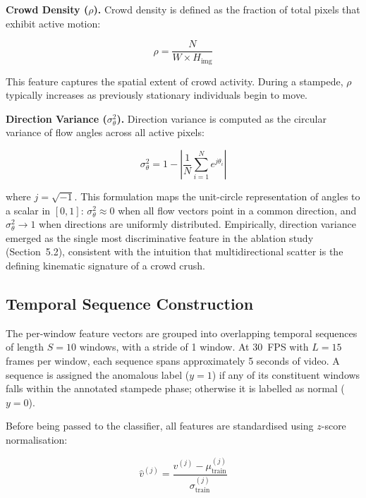 \textbf{Crowd Density ($\rho$).} Crowd density is defined as the fraction of total pixels that exhibit active motion:

\begin{equation}
  \rho = \frac{N}{W \times H_{\text{img}}}
  \label{eq:density}
\end{equation}

This feature captures the spatial extent of crowd activity. During a stampede, $\rho$ typically increases as previously stationary individuals begin to move.

\textbf{Direction Variance ($\sigma^2_\theta$).} Direction variance is computed as the circular variance of flow angles across all active pixels:

\begin{equation}
  \sigma^2_\theta = 1 - \left| \frac{1}{N} \sum_{i=1}^{N} e^{j\theta_i} \right|
  \label{eq:dir_var}
\end{equation}

\noindent where $j = \sqrt{-1}$. This formulation maps the unit-circle representation of angles to a scalar in $[0, 1]$: $\sigma^2_\theta \approx 0$ when all flow vectors point in a common direction, and $\sigma^2_\theta \to 1$ when directions are uniformly distributed. Empirically, direction variance emerged as the single most discriminative feature in the ablation study (Section~5.2), consistent with the intuition that multidirectional scatter is the defining kinematic signature of a crowd crush.

\subsection{Temporal Sequence Construction}

The per-window feature vectors are grouped into overlapping temporal sequences of length $S = 10$ windows, with a stride of 1 window. At 30~FPS with $L = 15$ frames per window, each sequence spans approximately 5 seconds of video. A sequence is assigned the anomalous label ($y = 1$) if any of its constituent windows falls within the annotated stampede phase; otherwise it is labelled as normal ($y = 0$).

Before being passed to the classifier, all features are standardised using $z$-score normalisation:

\begin{equation}
  \hat{v}^{(j)} = \frac{v^{(j)} - \mu_{\text{train}}^{(j)}}{\sigma_{\text{train}}^{(j)}}
  \label{eq:zscore}
\end{equation}

